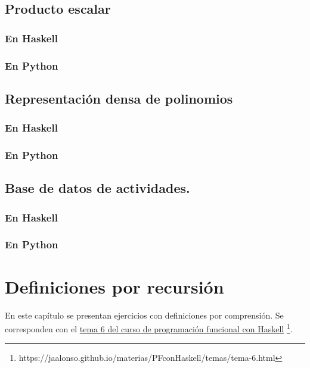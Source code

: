 \documentclass[a4paper,12pt,twoside]{book}
\begin{document}
\section{Producto escalar}
\subsection*{En Haskell}
\subsection*{En Python}

\section{Representación densa de polinomios}
\subsection*{En Haskell}
\subsection*{En Python}

\section{Base de datos de actividades.}
\subsection*{En Haskell}
\subsection*{En Python}

\chapter{Definiciones por recursión}

En este capítulo se presentan ejercicios con definiciones por
comprensión. Se corresponden con el
\href{https://jaalonso.github.io/materias/PFconHaskell/temas/tema-6.html}
{tema 6 del curso de programación funcional con Haskell}
\footnote{https://jaalonso.github.io/materias/PFconHaskell/temas/tema-6.html}.
\end{document}
